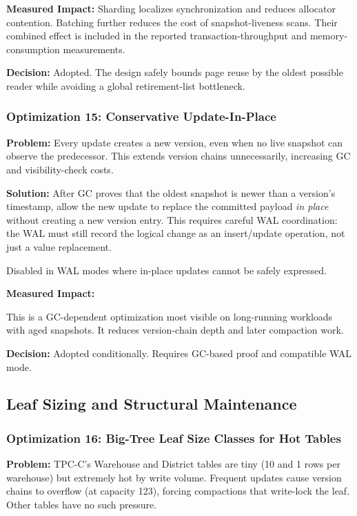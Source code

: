 \documentclass[11pt]{article}
\begin{document}
\textbf{Measured Impact:}
Sharding localizes synchronization and reduces allocator contention. Batching further
reduces the cost of snapshot-liveness scans. Their combined effect is included in the
reported transaction-throughput and memory-consumption measurements.

\textbf{Decision:} Adopted. The design safely bounds page reuse by the oldest possible
reader while avoiding a global retirement-list bottleneck.

\subsubsection{Optimization 15: Conservative Update-In-Place}

\textbf{Problem:}
Every update creates a new version, even when no live snapshot can observe the
predecessor. This extends version chains unnecessarily, increasing GC and visibility-check
costs.

\textbf{Solution:}
After GC proves that the oldest snapshot is newer than a version's timestamp, allow
the new update to replace the committed payload \emph{in place} without creating a
new version entry. This requires careful WAL coordination: the WAL must still record
the logical change as an insert/update operation, not just a value replacement.

Disabled in WAL modes where in-place updates cannot be safely expressed.

\textbf{Measured Impact:}

This is a GC-dependent optimization most visible on long-running workloads with aged
snapshots. It reduces version-chain depth and later compaction work.

\textbf{Decision:} Adopted conditionally. Requires GC-based proof and compatible WAL
mode.

\subsection{Leaf Sizing and Structural Maintenance}
\label{sec:leaf_sizing}

\subsubsection{Optimization 16: Big-Tree Leaf Size Classes for Hot Tables}

\textbf{Problem:}
TPC-C's Warehouse and District tables are tiny (10 and 1 rows per warehouse) but
extremely hot by write volume. Frequent updates cause version chains to overflow
(at capacity 123), forcing compactions that write-lock the leaf. Other tables have
no such pressure.
\end{document}
